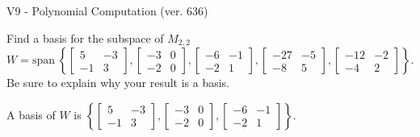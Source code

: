 \begin{exercise}
  \begin{exerciseTitle}V9 - Polynomial Computation (ver. 636)\end{exerciseTitle}
  \begin{exerciseStatement}
    Find a basis for the subspace of \(M_{2,2}\) 
\[W=\mathrm{span}\ \left\{\left[\begin{array}{cc}
5 & -3 \\
-1 & 3
\end{array}\right] , \left[\begin{array}{cc}
-3 & 0 \\
-2 & 0
\end{array}\right] , \left[\begin{array}{cc}
-6 & -1 \\
-2 & 1
\end{array}\right] , \left[\begin{array}{cc}
-27 & -5 \\
-8 & 5
\end{array}\right] , \left[\begin{array}{cc}
-12 & -2 \\
-4 & 2
\end{array}\right]\right\}.\]
 Be sure to explain why your result is a basis.


  \end{exerciseStatement}
  \begin{exerciseAnswer}
   A basis of \(W\) is  \(\left\{\left[\begin{array}{cc}
5 & -3 \\
-1 & 3
\end{array}\right] , \left[\begin{array}{cc}
-3 & 0 \\
-2 & 0
\end{array}\right] , \left[\begin{array}{cc}
-6 & -1 \\
-2 & 1
\end{array}\right]\right\}\).
  


  \end{exerciseAnswer}
\end{exercise}